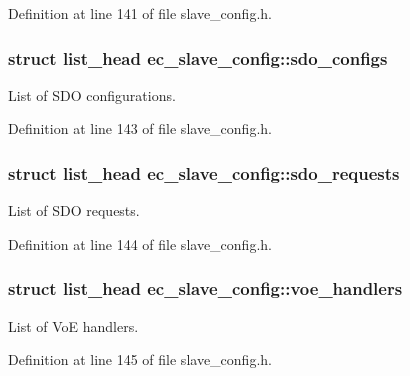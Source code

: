 \-Definition at line 141 of file slave\-\_\-config.\-h.

\subsubsection[{sdo\-\_\-configs}]{\setlength{\rightskip}{0pt plus 5cm}struct list\-\_\-head {\bf ec\-\_\-slave\-\_\-config\-::sdo\-\_\-configs}}\label{structec__slave__config_aa980b60539d3818999fe9ba116851e1c}


\-List of \-S\-D\-O configurations. 



\-Definition at line 143 of file slave\-\_\-config.\-h.

\subsubsection[{sdo\-\_\-requests}]{\setlength{\rightskip}{0pt plus 5cm}struct list\-\_\-head {\bf ec\-\_\-slave\-\_\-config\-::sdo\-\_\-requests}}\label{structec__slave__config_a51461cce3b38ac55be3e046c5e93a932}


\-List of \-S\-D\-O requests. 



\-Definition at line 144 of file slave\-\_\-config.\-h.

\subsubsection[{voe\-\_\-handlers}]{\setlength{\rightskip}{0pt plus 5cm}struct list\-\_\-head {\bf ec\-\_\-slave\-\_\-config\-::voe\-\_\-handlers}}\label{structec__slave__config_afab81a75365c94fde03e15446fe7cc9e}


\-List of \-Vo\-E handlers. 



\-Definition at line 145 of file slave\-\_\-config.\-h.

